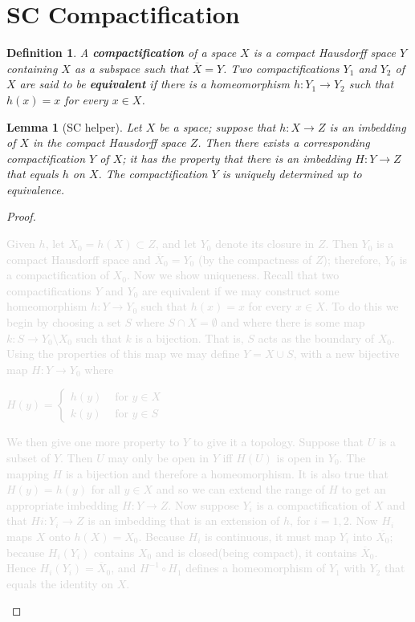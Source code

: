 \documentclass[article,11pt, reqno]{article}
\newtheorem*{lemma}{Lemma}
\newtheorem*{definition}{Definition}
\theoremstyle{remark}
\newcommand{\inv}{^{-1}}
\newcommand{\ra}{\rightarrow}
\newcommand{\<}{\langle}
\renewcommand{\>}{\rangle}
\begin{document}
\section{SC Compactification}
\begin{definition}
    A \textbf{compactification} of a space $X$ is a compact Hausdorff space $Y$ containing $X$ as a subspace such that $\overline{X} = Y$. Two compactifications $Y_1$ and $Y_2$ of $X$ are said to be \textbf{equivalent} if there is a homeomorphism $h : Y_1\ra Y_2$ such that $h(x) = x$ for every $x\in X$.
\end{definition}
\begin{lemma}[SC helper]
    Let $X$ be a space; suppose that $h:X\ra Z$ is an imbedding of $X$ in the compact Hausdorff space $Z$. Then there exists a corresponding compactification $Y$ of $X$; it has the property that there is an imbedding $H : Y\ra Z$ that equals $h$ on $X$. The compactification $Y$ is uniquely determined up to equivalence.
\end{lemma}
\begin{proof}
    \textcolor{lightgray}{Given $h$, let $X_0=h(X)\subset Z$, and let $Y_0$ denote its closure in $Z$. Then $Y_0$ is a compact Hausdorff space and $\overline{X}_0 = Y_0$ (by the compactness of $Z$); therefore, $Y_0$ is a compactification of $X_0$.
    Now we show uniqueness. Recall that two compactifications $Y$ and $Y_0$ are equivalent if we may construct some homeomorphism $h : Y\ra Y_0$ such that $h(x) = x$ for every $x\in X$. To do this we begin by choosing a set $S$ where $S\cap X =\emptyset$ and where there is some map $k : S\ra Y_0\setminus X_0$ such that $k$ is a bijection. That is, $S$ acts as the boundary of $X_0$. Using the properties of this map we may define $Y = X\cup S$, with a new bijective map $H : Y\ra Y_0$ where
        \begin{center}
            $H(y)=
            \begin{cases}
                h(y)& \text{ for } y\in X\\
                k(y)& \text{ for } y\in S 
            \end{cases}$
        \end{center}
    We then give one more property to $Y$ to give it a topology. Suppose that $U$ is a subset of $Y$. Then $U$ may only be open in $Y$ iff $H(U)$ is open in $Y_0$. The mapping $H$ is a bijection and therefore a homeomorphism. It is also true that $H(y) = h(y)$ for all $y\in X$ and so we can extend the range of $H$ to get an appropriate imbedding $H: Y\ra Z$.
    Now suppose $Y_i$ is a compactification of $X$ and that $Hi : Y_i\ra Z$ is an imbedding that is an extension of $h$, for $i = 1, 2$. Now $H_i$ maps $X$ onto $h(X) = X_0$. 
    Because $H_i$ is continuous, it must map $Y_i$ into $\overline{X_0}$; because $H_i(Y_i)$ contains $X_0$ and is closed(being compact), it contains $\overline{X}_0$. 
    Hence $H_i(Y_i) = \overline{X}_0$, and $H\inv\circ H_1$ defines a homeomorphism of $Y_1$ with $Y_2$ that equals the identity on $X$.}
    \end{proof}
\end{document}
